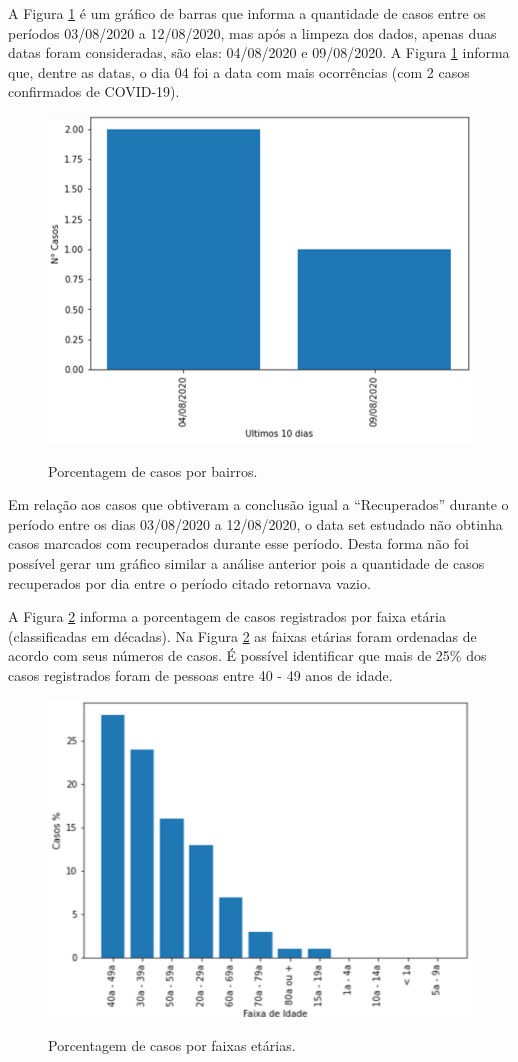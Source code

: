\documentclass[12pt]{article}
\begin{document}
A Figura \ref{fig:seção_2.2_questão_3} é um gráfico de barras que informa a quantidade de casos entre os períodos 03/08/2020 a 12/08/2020, mas após a limpeza dos dados, apenas duas datas foram consideradas, são elas: 04/08/2020 e 09/08/2020. A Figura \ref{fig:seção_2.2_questão_3} informa que, dentre as datas, o dia 04 foi a data com mais ocorrências (com 2 casos confirmados de COVID-19).

\begin{figure}[!ht]
  \centering
    \includegraphics[width=.5\linewidth]{Figuras/numero_de_casos_nos_ultimos_10_dias.png} \\
  \caption{Porcentagem de casos por bairros.}
  \label{fig:seção_2.2_questão_3}
\end{figure}

Em relação aos casos que obtiveram a conclusão igual a ``Recuperados'' durante o período entre os dias 03/08/2020 a 12/08/2020, o data set estudado não obtinha casos marcados com recuperados durante esse período. Desta forma não foi possível gerar um gráfico similar a análise anterior pois a quantidade de casos recuperados por dia entre o período citado retornava vazio.

A Figura \ref{fig:seção_2.2_questão_5} informa a porcentagem de casos registrados por faixa etária (classificadas em décadas). Na Figura \ref{fig:seção_2.2_questão_5} as faixas etárias foram ordenadas de acordo com seus números de casos. É possível identificar que mais de 25\% dos casos registrados foram de pessoas entre 40 - 49 anos de idade.

\begin{figure}[!ht]
  \centering
    \includegraphics[width=.5\linewidth]{Figuras/casos_por_faixa_etaria.png} \\
  \caption{Porcentagem de casos por faixas etárias.}
  \label{fig:seção_2.2_questão_5}
\end{figure}
\end{document}
